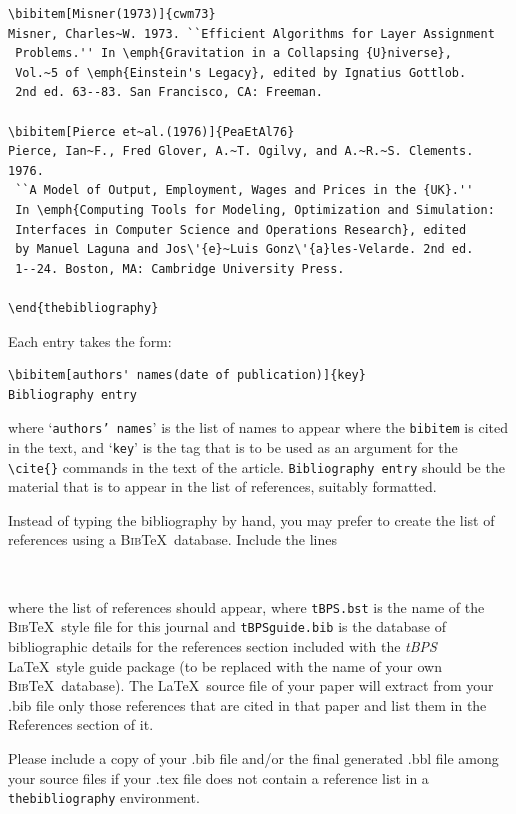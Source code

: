 \documentclass{tBPS2e}
\theoremstyle{plain}
\theoremstyle{definition}
\theoremstyle{remark}
\begin{document}
\begin{verbatim}
\bibitem[Misner(1973)]{cwm73}
Misner, Charles~W. 1973. ``Efficient Algorithms for Layer Assignment
 Problems.'' In \emph{Gravitation in a Collapsing {U}niverse},
 Vol.~5 of \emph{Einstein's Legacy}, edited by Ignatius Gottlob.
 2nd ed. 63--83. San Francisco, CA: Freeman.

\bibitem[Pierce et~al.(1976)]{PeaEtAl76}
Pierce, Ian~F., Fred Glover, A.~T. Ogilvy, and A.~R.~S. Clements. 1976.
 ``A Model of Output, Employment, Wages and Prices in the {UK}.''
 In \emph{Computing Tools for Modeling, Optimization and Simulation:
 Interfaces in Computer Science and Operations Research}, edited
 by Manuel Laguna and Jos\'{e}~Luis Gonz\'{a}les-Velarde. 2nd ed.
 1--24. Boston, MA: Cambridge University Press.

\end{thebibliography}
\end{verbatim}
\medskip
\noindent Each entry takes the form:
\begin{verbatim}
\bibitem[authors' names(date of publication)]{key}
Bibliography entry
\end{verbatim}
\noindent where `\texttt{authors' names}' is the list of names to appear where the \verb"bibitem" is cited in the text, and `\texttt{key}' is the tag that is to be used as an argument for the \verb"\cite{}" commands in the text of the article. \texttt{Bibliography entry} should be the material that is to appear in the list of references, suitably formatted.

Instead of typing the bibliography by hand, you may prefer to create the list of references using a \textsc{Bib}\TeX\ database. Include the lines
\begin{verbatim}


\end{verbatim}
where the list of references should appear, where \texttt{tBPS.bst} is the name of the \textsc{Bib}\TeX\ style file for this journal and \texttt{tBPSguide.bib} is the database of bibliographic details for the references section included with the \textit{tBPS} \LaTeX\ style guide package (to be replaced with the name of your own \textsc{Bib}\TeX\ database). The \LaTeX\ source file of your paper will extract from your .bib file only those references that are cited in that paper and list them in the References section of it.

Please include a copy of your .bib file and/or the final generated .bbl file among your source files if your .tex file does not contain a reference list in a \texttt{thebibliography} environment.
\end{document}
